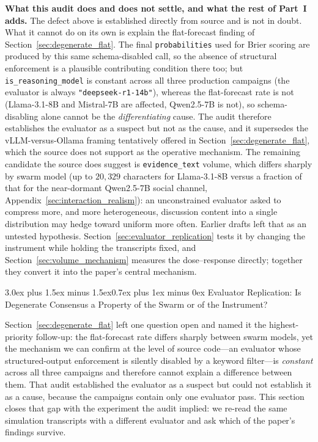 \documentclass[11pt,journal,onecolumn]{IEEEtran}
\makeatletter
\renewcommand\section{\@startsection{section}{1}{\z@}%
  {3.0ex plus 1.5ex minus 1.5ex}{0.7ex plus 1ex minus 0ex}%
  {\normalfont\normalsize\centering\bfseries}}
\makeatother
\begin{document}
\textbf{What this audit does and does not settle, and what the rest of Part~I adds.} The defect above is established directly from source and is not in doubt. What it cannot do on its own is explain the flat-forecast finding of Section~\ref{sec:degenerate_flat}. The final \texttt{probabilities} used for Brier scoring are produced by this same schema-disabled call, so the absence of structural enforcement is a plausible contributing condition there too; but \texttt{is\_reasoning\_model} is constant across all three production campaigns (the evaluator is always \texttt{"deepseek-r1-14b"}), whereas the flat-forecast rate is not (Llama-3.1-8B and Mistral-7B are affected, Qwen2.5-7B is not), so schema-disabling alone cannot be the \emph{differentiating} cause. The audit therefore establishes the evaluator as a suspect but not as the cause, and it supersedes the vLLM-versus-Ollama framing tentatively offered in Section~\ref{sec:degenerate_flat}, which the source does not support as the operative mechanism. The remaining candidate the source does suggest is \texttt{evidence\_text} volume, which differs sharply by swarm model (up to $20{,}329$ characters for Llama-3.1-8B versus a fraction of that for the near-dormant Qwen2.5-7B social channel, Appendix~\ref{sec:interaction_realism}): an unconstrained evaluator asked to compress more, and more heterogeneous, discussion content into a single distribution may hedge toward uniform more often. Earlier drafts left that as an untested hypothesis. Section~\ref{sec:evaluator_replication} tests it by changing the instrument while holding the transcripts fixed, and Section~\ref{sec:volume_mechanism} measures the dose--response directly; together they convert it into the paper's central mechanism.

\section{Evaluator Replication: Is Degenerate Consensus a Property of the Swarm or of the Instrument?}
\label{sec:evaluator_replication}

Section~\ref{sec:degenerate_flat} left one question open and named it the highest-priority follow-up: the flat-forecast rate differs sharply between swarm models, yet the mechanism we can confirm at the level of source code---an evaluator whose structured-output enforcement is silently disabled by a keyword filter---is \emph{constant} across all three campaigns and therefore cannot explain a difference between them. That audit established the evaluator as a suspect but could not establish it as a cause, because the campaigns contain only one evaluator pass. This section closes that gap with the experiment the audit implied: we re-read the same simulation transcripts with a different evaluator and ask which of the paper's findings survive.
\end{document}

